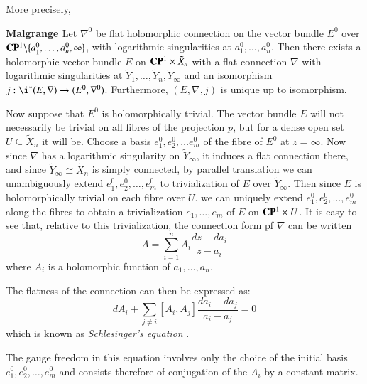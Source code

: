  More precisely,

\begin{theorem}\label{art7-thm-1}
{\bf Malgrange \cite{art7-key10}} Let $\nabla^{0}$ be flat holomorphic connection on the vector bundle $E^{0}$ over $\mathbf{C}\mathbf{P}^{1}\backslash \{ a_{1}^{0}, \ldots, a_{n}^{0}, \infty\}$, with logarithmic singularities at $a_{1}^{0}, \ldots, a_{n}^{0}$. Then there exists a holomorphic vector bundle $E$ on $\mathbf{C} \mathbf{P}^{1} \times \tilde{X}_{n}$ with a flat connection $\nabla$ with logarithmic singularities at $\tilde{Y}_{1}, \ldots,\tilde{Y}_{n}, \tilde{Y}_{\infty}$ and an isomorphism $j : \i^{*} (E, \nabla) \rightarrow (E^{0}, \nabla^{0})$. Furthermore, $(E, \nabla, j)$ is unique up to isomorphism.
\end{theorem}

 Now suppose that $E^{0}$ is holomorphically trivial. The vector bundle $E$ will not necessarily be trivial on all fibres of the projection $p$, but for a dense open set $U \subseteq \tilde{X}_{n}$ it will be. Choose a basis $e_{1}^{0}, e_{2}^{0}, \ldots e_{m}^{0}$ of the fibre of $E^{0}$ at $z = \infty$. Now since $\nabla$ has a logarithmic singularity on $\tilde{Y}_{\infty}$, it induces a flat connection there, and since $\tilde{Y}_{\infty} \cong \tilde{X}_{n}$ is simply connected, by parallel translation we can unambiguously extend $e_{1}^{0}, e_{2}^{0}, \ldots, e_{m}^{0}$ to trivialization of $E$ over $\tilde{Y}_{\infty}$. Then since $E$ is holomorphically trivial on each fibre over $U$. we can uniquely extend $e_{1}^{0}, e_{2}^{0}, \ldots, e_{m}^{0}$ along the fibres to obtain a trivialization $e_{1}, \ldots, e_{m}$ of $E$ on $\mathbf{C}\mathbf{P}^{1} \times U$. It is easy to see that, relative to this trivialization, the connection form pf $\nabla$ can be written
\begin{equation}\label{art7-eq-2}
A = \sum\limits_{i=1}^{n}A_{i} \dfrac{dz-da_{i}}{z-a_{i}}
\end{equation}
where $A_{i}$ is a holomorphic function of $a_{1}, \ldots, a_{n}$.

The flatness of the connection can then be expressed as:
$$
dA_{i} + \sum\limits_{j\neq i}[A_{i}, A_{j}]\dfrac{da_{i}-da_{j}}{a_{i}-a_{j}} =0
$$
which is known as \textit{Schlesinger's equation} \cite{art7-key15}.

The gauge freedom in this equation involves only the choice of the initial basis $e_{1}^{0}, e_{2}^{0}, \ldots, e_{m}^{0}$ and consists therefore of conjugation of the $A_{i}$ by a constant matrix.

